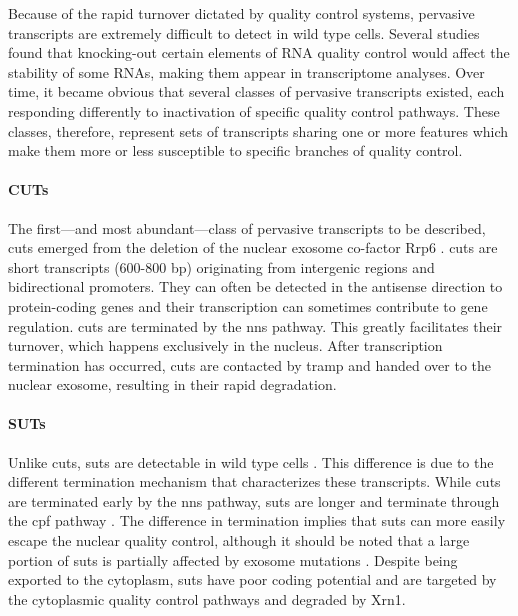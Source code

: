 Because of the rapid turnover dictated by quality control systems, pervasive transcripts are extremely difficult to detect in wild type cells.
Several studies found that knocking-out certain elements of RNA quality control would affect the stability of some RNAs, making them appear in transcriptome analyses.
Over time, it became obvious that several classes of pervasive transcripts existed, each responding differently to inactivation of specific quality control pathways.
These classes, therefore, represent sets of transcripts sharing one or more features which make them more or less susceptible to specific branches of quality control.



\paragraph{CUTs}

The first---and most abundant---class of pervasive transcripts to be described, \gls{cuts} emerged from the deletion of the nuclear exosome co-factor Rrp6 \cite{wyers:2005:cryptic}.
\gls{cuts} are short transcripts (600-800 bp) originating from intergenic regions and bidirectional promoters.
They can often be detected in the antisense direction to protein-coding genes and their transcription can sometimes contribute to gene regulation.
\gls{cuts} are terminated by the \gls{nns} pathway.
This greatly facilitates their turnover, which happens exclusively in the nucleus.
After transcription termination has occurred, \gls{cuts} are contacted by \gls{tramp} and handed over to the nuclear exosome, resulting in their rapid degradation. 

\paragraph{SUTs}

Unlike \gls{cuts}, \gls{suts} are detectable in wild type cells \cite{david:2006:highresolution}.
This difference is due to the different termination mechanism that characterizes these transcripts.
While \gls{cuts} are terminated early by the \gls{nns} pathway, \gls{suts} are longer and terminate through the \gls{cpf} pathway \cite{marquardt:2011:distinct}.
The difference in termination implies that \gls{suts} can more easily escape the nuclear quality control, although it should be noted that a large portion of \gls{suts} is partially affected by exosome mutations \cite{gudipati:2012:extensive, marquardt:2011:distinct}.
Despite being exported to the cytoplasm, \gls{suts} have poor coding potential and are targeted by the cytoplasmic quality control pathways and degraded by Xrn1. 

